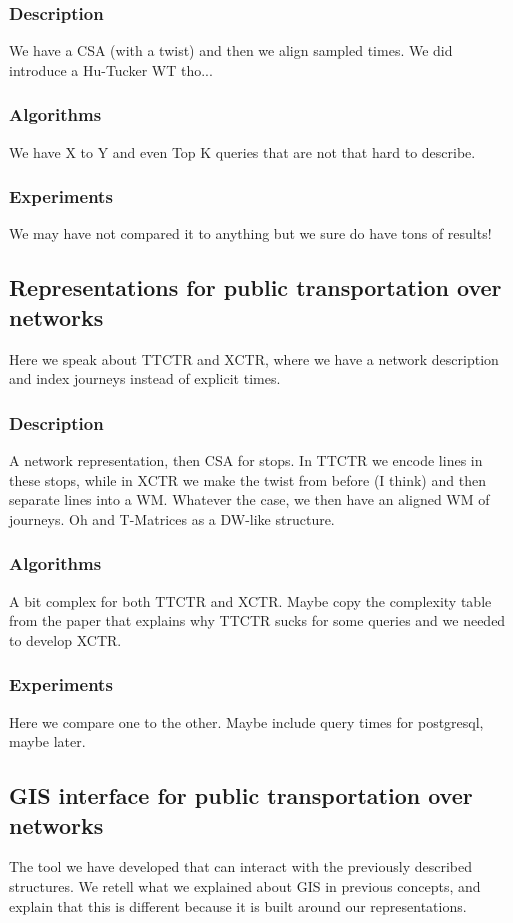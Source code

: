 \documentclass{UniVieCS_PhD} %
\begin{document}
	\subsubsection{Description}
	We have a CSA (with a twist) and then we align sampled times. We did introduce a Hu-Tucker WT tho...
	
	\subsubsection{Algorithms}
	We have X to Y and even Top K queries that are not that hard to describe.
	
	\subsubsection{Experiments}
	We may have not compared it to anything but we sure do have tons of results!
	
	\subsection{Representations for public transportation over networks}
	Here we speak about TTCTR and XCTR, where we have a network description and index journeys instead of explicit times.
	
	\subsubsection{Description}
	A network representation, then CSA for stops. In TTCTR we encode lines in these stops, while in XCTR we make the twist from before (I think) and then separate lines into a WM. Whatever the case, we then have an aligned WM of journeys. Oh and T-Matrices as a DW-like structure.
	
	\subsubsection{Algorithms}
	A bit complex for both TTCTR and XCTR. Maybe copy the complexity table from the paper that explains why TTCTR sucks for some queries and we needed to develop XCTR.
	
	\subsubsection{Experiments}
	Here we compare one to the other. Maybe include query times for postgresql, maybe later.
	
	\subsection{GIS interface for public transportation over networks}
	The tool we have developed that can interact with the previously described structures. We retell what we explained about GIS in previous concepts, and explain that this is different because it is built around our representations.
	
\end{document}
